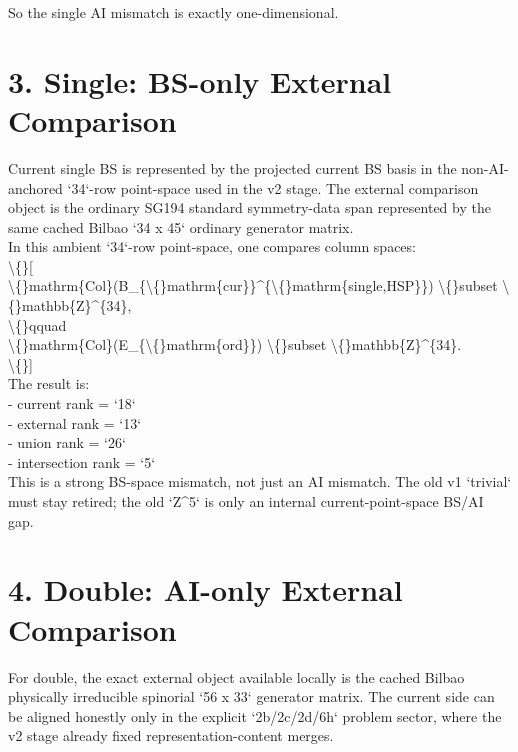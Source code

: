 \documentclass[11pt]{article}
\begin{document}
So the single AI mismatch is exactly one-dimensional.\\

\section*{3. Single: BS-only External Comparison}

Current single BS is represented by the projected current BS basis in the non-AI-anchored `34`-row point-space used in the v2 stage. The external comparison object is the ordinary SG194 standard symmetry-data span represented by the same cached Bilbao `34 x 45` ordinary generator matrix.\\

In this ambient `34`-row point-space, one compares column spaces:\\
\textbackslash\{\}[\\
\textbackslash\{\}mathrm\{Col\}(B\_\{\textbackslash\{\}mathrm\{cur\}\}\textasciicircum{}\{\textbackslash\{\}mathrm\{single,HSP\}\}) \textbackslash\{\}subset \textbackslash\{\}mathbb\{Z\}\textasciicircum{}\{34\},\\
\textbackslash\{\}qquad\\
\textbackslash\{\}mathrm\{Col\}(E\_\{\textbackslash\{\}mathrm\{ord\}\}) \textbackslash\{\}subset \textbackslash\{\}mathbb\{Z\}\textasciicircum{}\{34\}.\\
\textbackslash\{\}]\\

The result is:\\
- current rank = `18`\\
- external rank = `13`\\
- union rank = `26`\\
- intersection rank = `5`\\

This is a strong BS-space mismatch, not just an AI mismatch. The old v1 `trivial` must stay retired; the old `Z\textasciicircum{}5` is only an internal current-point-space BS/AI gap.\\

\section*{4. Double: AI-only External Comparison}

For double, the exact external object available locally is the cached Bilbao physically irreducible spinorial `56 x 33` generator matrix. The current side can be aligned honestly only in the explicit `2b/2c/2d/6h` problem sector, where the v2 stage already fixed representation-content merges.\\
\end{document}
